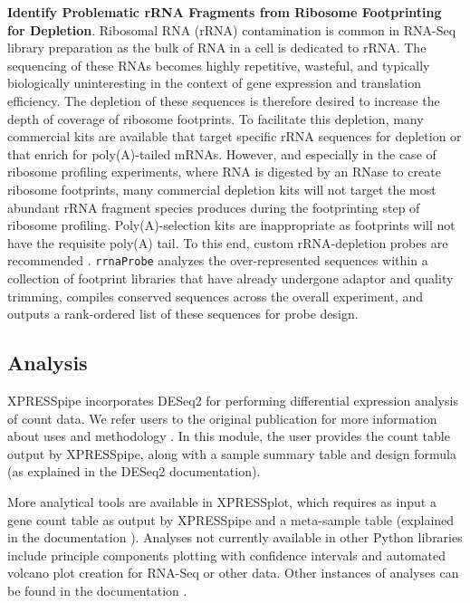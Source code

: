 \documentclass[10pt, oneside]{article}
\begin{document}
\begin{multicols}{2}
\noindent\textbf{Identify Problematic rRNA Fragments from Ribosome Footprinting for Depletion}. Ribosomal RNA (rRNA) contamination is common in RNA-Seq library preparation as the bulk of RNA in a cell is dedicated to rRNA. The sequencing of these RNAs becomes highly repetitive, wasteful, and typically biologically uninteresting in the context of gene expression and translation efficiency. The depletion of these sequences is therefore desired to increase the depth of coverage of ribosome footprints. To facilitate this depletion, many commercial kits are available that target specific rRNA sequences for depletion or that enrich for poly(A)-tailed mRNAs. However, and especially in the case of ribosome profiling experiments, where RNA is digested by an RNase to create ribosome footprints, many commercial depletion kits will not target the most abundant rRNA fragment species produces during the footprinting step of ribosome profiling. Poly(A)-selection kits are inappropriate as footprints will not have the requisite poly(A) tail. To this end, custom rRNA-depletion probes are recommended \cite{ingolia_meth, ingolia_science}. \texttt{rrnaProbe} analyzes the over-represented sequences within a collection of footprint libraries that have already undergone adaptor and quality trimming, compiles conserved sequences across the overall experiment, and outputs a rank-ordered list of these sequences for probe design. \par

\subsection*{Analysis}
XPRESSpipe incorporates DESeq2 for performing differential expression analysis of count data. We refer users to the original publication for more information about uses and methodology \cite{deseq2}. In this module, the user provides the count table output by XPRESSpipe, along with a sample summary table and design formula (as explained in the DESeq2 documentation). \par

More analytical tools are available in XPRESSplot, which requires as input a gene count table as output by XPRESSpipe and a meta-sample table (explained in the documentation \cite{xpressplot_docs}). Analyses not currently available in other Python libraries include principle components plotting with confidence intervals and automated volcano plot creation for RNA-Seq or other data. Other instances of analyses can be found in the documentation \cite{xpressplot_docs}. \par


\end{multicols}
\end{document}
